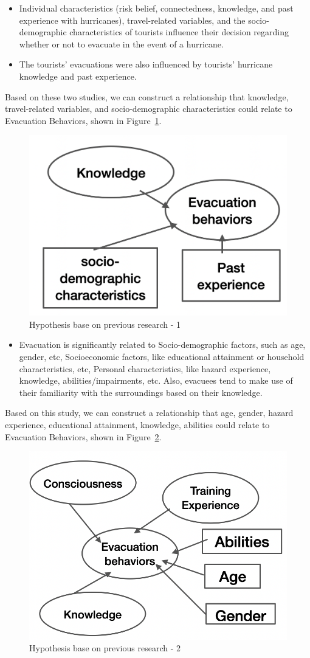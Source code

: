 \begin{itemize}
\item Individual characteristics (risk belief, connectedness, knowledge, and past experience with hurricanes), travel-related variables, and the socio-demographic characteristics of tourists influence their decision regarding whether or not to evacuate in the event of a hurricane.~\cite{ref19}
\item The tourists' evacuations were also influenced by tourists' hurricane knowledge and past experience.~\cite{Cahyanto2016StatedPO}
\end{itemize}

Based on these two studies, we can construct a relationship that knowledge, travel-related variables, and socio-demographic characteristics could relate to Evacuation Behaviors, shown in Figure~\ref{fig7}.

\begin{figure}[h]
  \includegraphics[width=0.5\linewidth]{Figure/Figure7.png}
  \centering
  \caption{Hypothesis base on previous research - 1 }
  \label{fig7}
\end{figure}

\begin{itemize}
\item Evacuation is significantly related to Socio-demographic factors, such as age, gender, etc, Socioeconomic factors, like educational attainment or household characteristics, etc, Personal characteristics, like hazard experience, knowledge, abilities/impairments, etc. Also, evacuees tend to make use of their familiarity with the surroundings based on their knowledge.~\cite{ref9}
\end{itemize}

Based on this study, we can construct a relationship that age, gender, hazard experience,  educational attainment, knowledge, abilities could relate to Evacuation Behaviors, shown in Figure~\ref{fig8}. 

\begin{figure}[h]
  \includegraphics[width=0.5\linewidth]{Figure/Figure8.png}
  \centering
  \caption{Hypothesis base on previous research - 2 }
  \label{fig8}
\end{figure}

